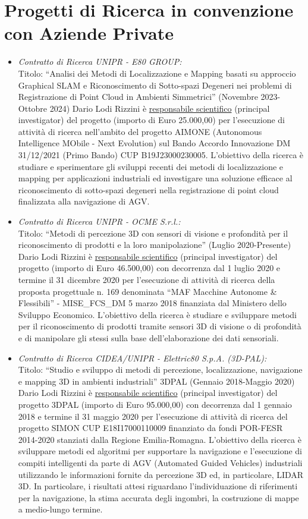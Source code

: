 \documentclass[11pt]{article}
\newcommand{\ITEMDATE}[1]{\item \textit{#1:}\\}
\begin{document}
\section*{Progetti di Ricerca in convenzione con Aziende Private}

\begin{itemize}

\ITEMDATE{Contratto di Ricerca UNIPR - E80 GROUP} 
Titolo: ``Analisi dei Metodi di Localizzazione e Mapping basati su approccio Graphical SLAM e Riconoscimento di Sotto-spazi Degeneri nei problemi di Registrazione di Point Cloud in Ambienti Simmetrici'' (Novembre 2023-Ottobre 2024)
Dario Lodi Rizzini \`e \underline{responsabile scientifico} (principal investigator) del progetto (importo di Euro 25.000,00) per l'esecuzione di attivit\`a di ricerca nell'ambito del progetto AIMONE (Autonomous Intelligence MObile - Next Evolution) sul Bando Accordo Innovazione DM 31/12/2021 (Primo Bando) CUP B19J23000230005. 
L'obiettivo della ricerca \`e studiare e sperimentare gli sviluppi recenti dei metodi di localizzazione e mapping per applicazioni industriali ed investigare una soluzione efficace al riconoscimento di sotto-spazi degeneri nella registrazione di point cloud finalizzata alla navigazione di AGV.

\ITEMDATE{Contratto di Ricerca UNIPR - OCME S.r.l.} 
Titolo: ``Metodi di percezione 3D con sensori di visione e profondit\`a per il riconoscimento di prodotti e la loro manipolazione'' (Luglio 2020-Presente)
Dario Lodi Rizzini \`e \underline{responsabile scientifico} (principal investigator) del progetto (importo di Euro 46.500,00) con decorrenza dal 1 luglio 2020 e termine 
il 31 dicembre 2020 per l'esecuzione di attivit\`a di ricerca della proposta progettuale n. 169 denominata ``MAF Macchine Autonome \& Flessibili'' - MISE\_FCS\_DM 5 marzo 2018 finanziata dal Ministero dello Sviluppo Economico. 
L'obiettivo della ricerca \`e studiare e sviluppare metodi per il riconoscimento di prodotti tramite sensori 3D di visione o di profondit\`a e di manipolare gli stessi sulla base dell’elaborazione dei dati sensoriali. 

\ITEMDATE{Contratto di Ricerca CIDEA/UNIPR - Elettric80 S.p.A. (3D-PAL)} 
Titolo: ``Studio e sviluppo di metodi di percezione, localizzazione, navigazione e mapping 3D in ambienti industriali'' 3DPAL (Gennaio 2018-Maggio 2020)
Dario Lodi Rizzini \`e \underline{responsabile scientifico} (principal investigator) del progetto 3DPAL (importo di Euro 95.000,00) con decorrenza dal 1 gennaio 2018 e termine 
il 31 maggio 2020 per l'esecuzione di attivit\`a di ricerca del progetto SIMON CUP E18I17000110009 finanziato da fondi POR-FESR 2014-2020 
stanziati dalla Regione Emilia-Romagna. 
L'obiettivo della ricerca \`e sviluppare metodi ed algoritmi per supportare la navigazione e l'esecuzione di compiti intelligenti
da parte di AGV (Automated Guided Vehicles) industriali utilizzando le informazioni fornite da percezione 3D ed, in particolare, LIDAR 3D. 
In particolare, i risultati attesi riguardano l'individuazione di riferimenti per la navigazione, la stima accurata degli ingombri, 
la costruzione di mappe a medio-lungo termine. 


\end{itemize}
\end{document}
